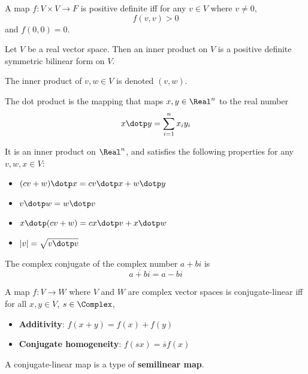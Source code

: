 
\begin{definition}
  A map $f : V \times V \to F$ is positive definite iff for any $v \in V$ where $v \neq 0$,
  \[
    f(v, v) > 0
  \]
  and $f(0, 0) = 0$.
\end{definition}

\begin{definition}
  Let $V$ be a real vector space. Then an inner product on $V$ is a positive definite symmetric bilinear form on $V$.

  The inner product of $v, w \in V$ is denoted $(v, w)$.
\end{definition}

\begin{definition}
  The dot product is the mapping that maps $x, y \in \Real^n$ to the real number
  \[
    x \dotp y = \sum_{i=1}^n x_i y_i
  \]

  It is an inner product on $\Real^n$, and satisfies the following properties for any $v, w, x \in V$:
  \begin{itemize}
    \item $(cv + w) \dotp x = cv \dotp x + w \dotp y$
    \item $v \dotp w = w \dotp v$
    \item $x \dotp (cv + w) = cx \dotp v + x \dotp w$
    \item $|v| = \sqrt{v \dotp v}$
  \end{itemize}
\end{definition}

\begin{definition}
  The complex conjugate of the complex number $a + bi$ is
  \[
    \overline{a + bi} = a - bi
  \]
\end{definition}

\begin{definition}
  A map $f : V \to W$ where $V$ and $W$ are complex vector spaces is conjugate-linear iff for all $x, y \in V$, $s \in \Complex$,
  \begin{itemize}
    \item \textbf{Additivity}: $f(x + y) = f(x) + f(y)$
    \item \textbf{Conjugate homogeneity}: $f(sx) = \overline{s} f(x)$
  \end{itemize}

  A conjugate-linear map is a type of \textbf{semilinear map}.
\end{definition}

